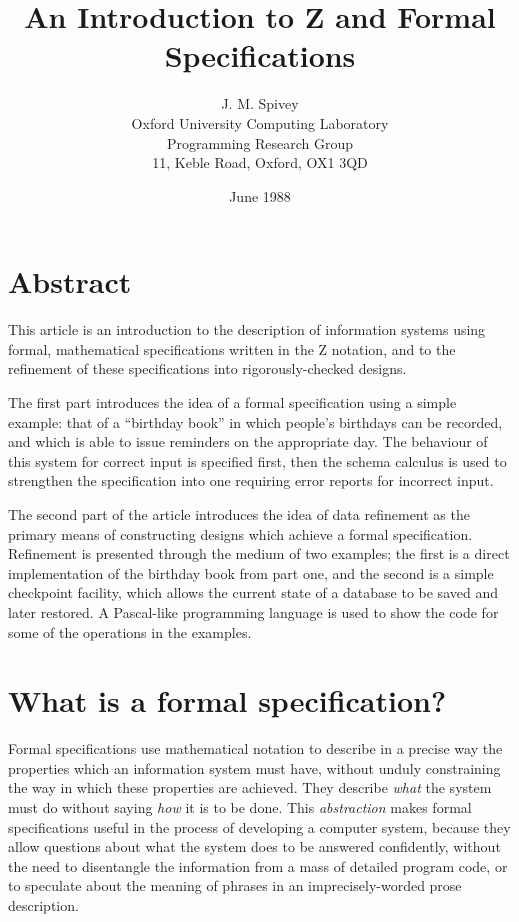 \documentclass[12pt]{article}
\begin{document}
\title{An Introduction to Z and Formal Specifications}
\author{J. M. Spivey\\
	Oxford University Computing Laboratory\\
	Programming Research Group\\
	11, Keble Road, Oxford, OX1 3QD}
\date{June 1988}
\maketitle

\section*{Abstract}

This article is an introduction to the description of information
systems using formal, mathematical specifications written in the Z
notation, and to the refinement of these specifications into
rigorously-checked designs.

The first part introduces the idea of a formal specification using a
simple example: that of a ``birthday book'' in which people's
birthdays can be recorded, and which is able to issue reminders on the
appropriate day.  The behaviour of this system for correct input is
specified first, then the schema calculus is used to strengthen the
specification into one requiring error reports for incorrect input.

The second part of the article introduces the idea of data refinement as
the primary means of constructing designs which achieve a formal
specification. Refinement is presented through the medium of two
examples; the first is a direct implementation of the birthday
book from part one, and the second is a simple checkpoint facility,
which allows the current state of a database to be saved and later
restored. A Pascal-like programming language is used to show
the code for some of the operations in the examples.

\clearpage
\section{What is a formal specification?}

Formal specifications use mathematical notation to describe in a
precise way the properties which an information system must have,
without unduly constraining the way in which these properties are
achieved. They describe {\em what\/} the system must do without saying
{\em how\/} it is to be done.  This {\em abstraction\/} makes formal
specifications useful in the process of developing a computer system,
because they allow questions about what the system does to be answered
confidently, without the need to disentangle the information from a
mass of detailed program code, or to speculate about the meaning of
phrases in an imprecisely-worded prose description.
\end{document}
